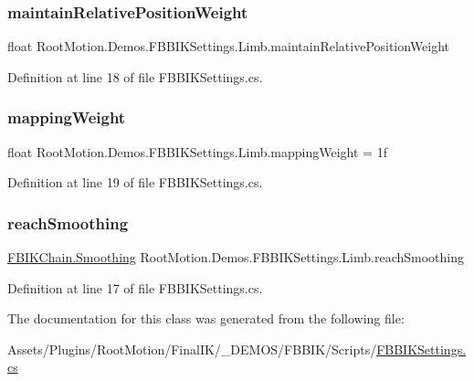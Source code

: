 \subsubsection{\texorpdfstring{maintain\+Relative\+Position\+Weight}{maintainRelativePositionWeight}}
{\footnotesize\ttfamily float Root\+Motion.\+Demos.\+F\+B\+B\+I\+K\+Settings.\+Limb.\+maintain\+Relative\+Position\+Weight}



Definition at line 18 of file F\+B\+B\+I\+K\+Settings.\+cs.

\mbox{\label{class_root_motion_1_1_demos_1_1_f_b_b_i_k_settings_1_1_limb_ab441d7e7c8ebd2b0ad9396f541759dc6}} 
\subsubsection{\texorpdfstring{mapping\+Weight}{mappingWeight}}
{\footnotesize\ttfamily float Root\+Motion.\+Demos.\+F\+B\+B\+I\+K\+Settings.\+Limb.\+mapping\+Weight = 1f}



Definition at line 19 of file F\+B\+B\+I\+K\+Settings.\+cs.

\mbox{\label{class_root_motion_1_1_demos_1_1_f_b_b_i_k_settings_1_1_limb_a722ca1f982adaa7797d00329e3b685a4}} 
\subsubsection{\texorpdfstring{reach\+Smoothing}{reachSmoothing}}
{\footnotesize\ttfamily \mbox{\hyperlink{class_root_motion_1_1_final_i_k_1_1_f_b_i_k_chain_a2c75de88180a5922368eaa4c4efb3ac9}{F\+B\+I\+K\+Chain.\+Smoothing}} Root\+Motion.\+Demos.\+F\+B\+B\+I\+K\+Settings.\+Limb.\+reach\+Smoothing}



Definition at line 17 of file F\+B\+B\+I\+K\+Settings.\+cs.



The documentation for this class was generated from the following file\+:\begin{DoxyCompactItemize}
\item 
Assets/\+Plugins/\+Root\+Motion/\+Final\+I\+K/\+\_\+\+D\+E\+M\+O\+S/\+F\+B\+B\+I\+K/\+Scripts/\mbox{\hyperlink{_f_b_b_i_k_settings_8cs}{F\+B\+B\+I\+K\+Settings.\+cs}}\end{DoxyCompactItemize}
